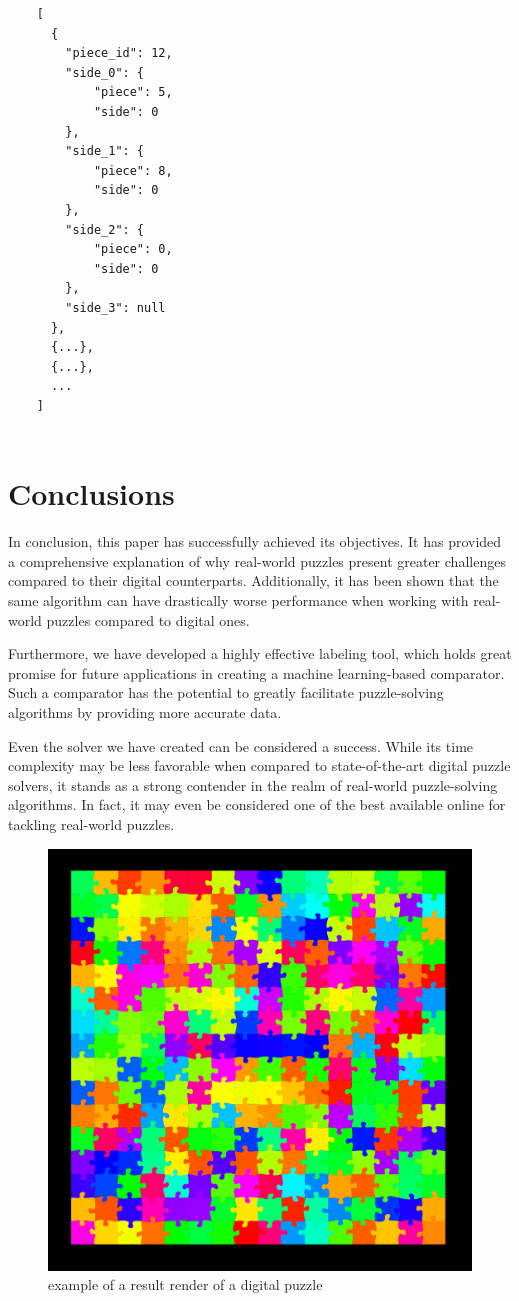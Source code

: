 \documentclass{article}
\begin{document}
\begin{minipage}{\textwidth}
  \begin{lstlisting}
    [
      {
        "piece_id": 12,
        "side_0": {
            "piece": 5,
            "side": 0
        },
        "side_1": {
            "piece": 8,
            "side": 0
        },
        "side_2": {
            "piece": 0,
            "side": 0
        },
        "side_3": null
      },
      {...},
      {...},
      ...
    ]
  
  \end{lstlisting}
\end{minipage}


\section{Conclusions}
In conclusion, this paper has successfully achieved its objectives.
It has provided a comprehensive explanation of why real-world puzzles
present greater challenges compared to their digital counterparts.
Additionally, it has been shown that the same algorithm can have drastically worse
performance when working with real-world puzzles compared to digital ones.

Furthermore, we have developed a highly effective labeling tool,
which holds great promise for future applications in creating a
machine learning-based comparator. Such a comparator has the potential
to greatly facilitate puzzle-solving algorithms by providing more
accurate data.

Even the solver we have created can be considered a success.
While its time complexity may be less favorable when compared to state-of-the-art
digital puzzle solvers, it stands as a strong contender in the realm of
real-world puzzle-solving algorithms. In fact, it may even be considered
one of the best available online for tackling real-world puzzles.

\begin{figure}[h]
  \caption{example of a result render of a digital puzzle}\label{fig:result_digital}
  \centering
  \includegraphics[height=0.6\textwidth]{pictures/result_digital.png}
\end{figure}
\end{document}
